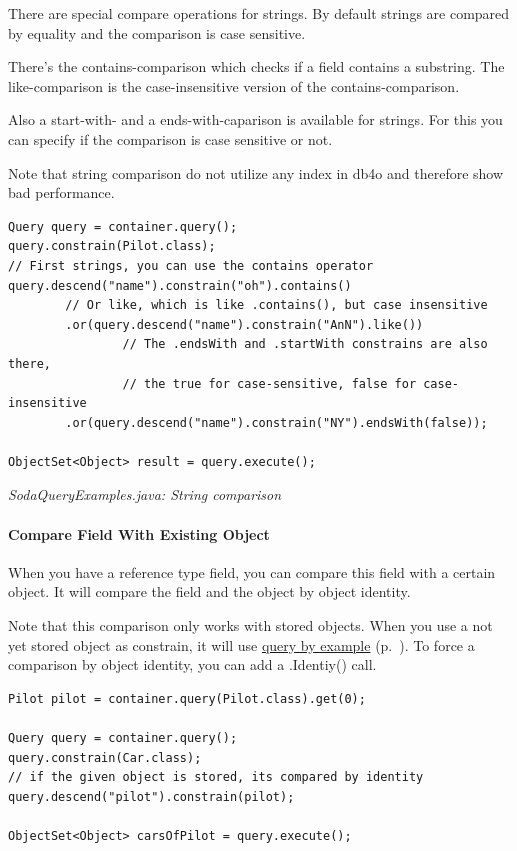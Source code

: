 There are special compare operations for strings. By default strings are compared by equality and the comparison is case sensitive.

There's the contains-comparison which checks if a field contains a substring. The like-comparison is the case-insensitive version of the contains-comparison.

Also a start-with- and a ends-with-caparison is available for strings. For this you can specify if the comparison is case sensitive or not.

Note that string comparison do not utilize any index in db4o and therefore show bad performance.

\begin{lstlisting}
Query query = container.query();
query.constrain(Pilot.class);
// First strings, you can use the contains operator
query.descend("name").constrain("oh").contains()
        // Or like, which is like .contains(), but case insensitive
        .or(query.descend("name").constrain("AnN").like())
                // The .endsWith and .startWith constrains are also there,
                // the true for case-sensitive, false for case-insensitive
        .or(query.descend("name").constrain("NY").endsWith(false));

ObjectSet<Object> result = query.execute();
\end{lstlisting}

{\small\itshape SodaQueryExamples.java: String comparison\par}
\medskip

\paragraph{Compare Field With Existing Object}
\label{ref:basics-querying-soda-soda-example-catelog:checkforobject}

When you have a reference type field, you can compare this field with a certain object. It will compare the field and the object by object identity.

Note that this comparison only works with stored objects. When you use a not yet stored object as constrain, it will use \hyperref[ref:basics-querying-soda-soda-special-case-examples]{query by example} (p.~\pageref{ref:basics-querying-soda-soda-special-case-examples}). To force a comparison by object identity, you can add a .Identiy() call.

\begin{lstlisting}
Pilot pilot = container.query(Pilot.class).get(0);

Query query = container.query();
query.constrain(Car.class);
// if the given object is stored, its compared by identity
query.descend("pilot").constrain(pilot);

ObjectSet<Object> carsOfPilot = query.execute();
\end{lstlisting}

